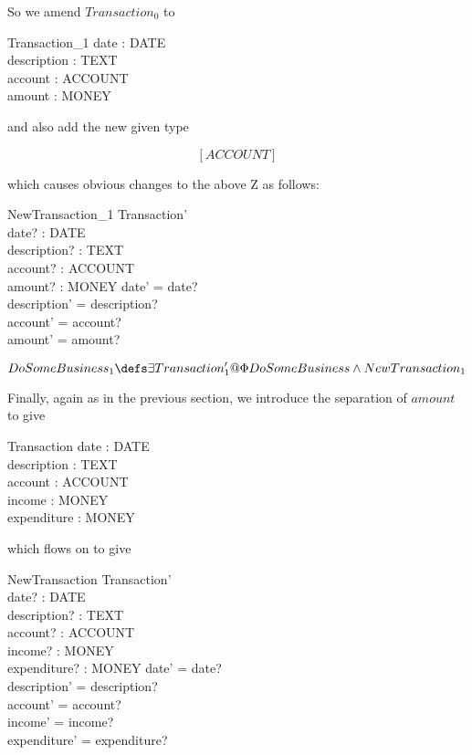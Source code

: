 \documentclass[11pt]{amsart}
\begin{document}
So we amend $Transaction_0$  to

\begin{schema}{Transaction_1}
date : DATE\\
description : TEXT\\
account : ACCOUNT\\
amount : MONEY
\end{schema}

and also add the new given type

\[
[ACCOUNT]
\]

which causes obvious changes to the above Z as follows:

\begin{schema}{NewTransaction_1}
Transaction'\\
date? : DATE\\
description? : TEXT\\
account? : ACCOUNT\\ 
amount? : MONEY
\where
date' = date?\\
description' = description?\\
account' = account?\\
amount' = amount?
\end{schema}

\[
DoSomeBusiness_1 \defs \exists Transaction_1' @ \Phi DoSomeBusiness \land New Transaction_1
\]

Finally, again as in the previous section, we introduce the separation of $amount$ to give

\begin{schema}{Transaction}
date : DATE\\
description : TEXT\\
account : ACCOUNT\\
income : MONEY\\
expenditure : MONEY
\end{schema}

which flows on to give

\begin{schema}{NewTransaction}
Transaction'\\
date? : DATE\\
description? : TEXT\\
account? : ACCOUNT\\ 
income? : MONEY\\
expenditure? : MONEY
\where
date' = date?\\
description' = description?\\
account' = account?\\
income' = income?\\
expenditure' = expenditure?
\end{schema}
\end{document}
